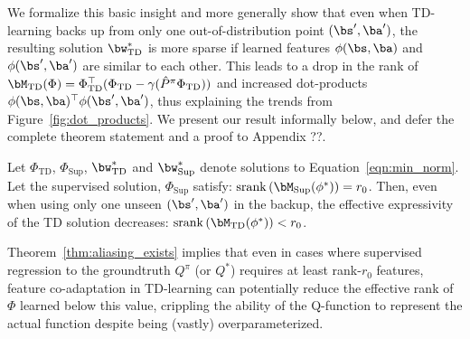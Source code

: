 We formalize this basic insight and more generally show that even when TD-learning backs up from only one out-of-distribution point $(\bs', \ba')$, the resulting solution $\bw^*_{\mathrm{TD}}$ is more sparse if learned features $\phi(\bs, \ba)$ and $\phi(\bs', \ba')$ are similar to each other. This leads to a drop in the rank of $\bM_{\mathrm{TD}}(\Phi) = \Phi_{\mathrm{TD}}^\top (\Phi_{\mathrm{TD}} - \gamma (\hat{P}^\pi \Phi_{\mathrm{TD}}))$ and increased dot-products $\phi(\bs, \ba)^\top \phi(\bs', \ba')$, thus explaining the trends from Figure~\ref{fig:dot_products}. We present our result informally below, and defer the complete theorem statement and a proof to Appendix ??.
\begin{theorem}[Informal]
\label{thm:aliasing_exists}
Let $\Phi_{\mathrm{TD}}$, $\Phi_{\mathrm{Sup}}$, $\bw^*_{\mathrm{TD}}$ and $\bw^*_{\mathrm{Sup}}$ denote solutions to Equation~\ref{eqn:min_norm}. Let the supervised solution, $\Phi_{\mathrm{Sup}}$ satisfy: $\mathrm{srank}\left(\bM_{\mathrm{Sup}}(\phi^*)\right) = r_0$. Then, even when using only one unseen $(\bs', \ba')$ in the backup, the effective expressivity of the TD solution decreases: $\mathrm{srank} \left(\bM_{\mathrm{TD}}(\phi^*)\right) < r_0$.
\end{theorem}
Theorem~\ref{thm:aliasing_exists} implies that even in cases where supervised regression to the groundtruth $Q^\pi$ (or $Q^*$) requires at least rank-$r_0$ features, feature co-adaptation in TD-learning can potentially reduce the effective rank of $\Phi$ learned below this value, crippling the ability of the Q-function to represent the actual function despite being (vastly) overparameterized. 

